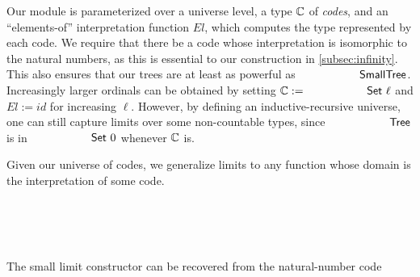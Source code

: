 Our module is parameterized over a universe level, a type ${\mathbb{C}}$ of \textit{codes}, and an ``elements-of'' interpretation
function $\mathit{El}$, which computes the type represented by each code.
We require that there be a code whose interpretation is isomorphic to the natural numbers,
as this is essential to our construction in \cref{subsec:infinity}.
This also ensures that our trees are at least as powerful as $\AgdaDatatype{SmallTree}$.
Increasingly larger ordinals can be obtained by setting $\bC := \AgdaPrimitive{Set} \ \ell$ and
$\mathit{El} := \mathit{id}$ for increasing $\ell$.
However, by defining an inductive-recursive universe,
one can still capture limits over some non-countable types, since
 $\AgdaDatatype{Tree}$ is in $\AgdaPrimitive{Set}\ 0$ whenever ${\mathbb{C}}$ is.

 Given our universe of codes,
 we generalize limits to any function whose domain is the interpretation of some code.
\begin{code}%
%
\>[4]\AgdaSpace{}%
\AgdaSpace{}%
\AgdaSymbol{:}\AgdaSpace{}%
\AgdaSpace{}%
\AgdaSpace{}%
\<%
\\
\>[4][@{}l@{\AgdaIndent{0}}]%
\>[6]\AgdaSpace{}%
\AgdaSymbol{:}\AgdaSpace{}%
\<%
\\
%
\>[6]\AgdaSpace{}%
\AgdaSymbol{:}\AgdaSpace{}%
\AgdaSpace{}%
\AgdaSpace{}%
\<%
\\
%
\>[6]\AgdaSpace{}%
\AgdaSymbol{:}\AgdaSpace{}%
\AgdaSymbol{(}\AgdaSpace{}%
\AgdaSymbol{:}\AgdaSpace{}%
\AgdaSpace{}%
\AgdaSymbol{)}\AgdaSpace{}%
\AgdaSpace{}%
\AgdaSymbol{(}\AgdaSpace{}%
\AgdaSymbol{:}\AgdaSpace{}%
\AgdaSpace{}%
\AgdaSpace{}%
\AgdaSpace{}%
\AgdaSymbol{)}\AgdaSpace{}%
\AgdaSpace{}%
\<%
\end{code}

The small limit constructor can be recovered from the natural-number code
\begin{code}%
%
\>[4]\AgdaSpace{}%
\AgdaSymbol{:}\AgdaSpace{}%
\AgdaSymbol{(}\AgdaSpace{}%
\AgdaSpace{}%
\AgdaSymbol{)}\AgdaSpace{}%
\AgdaSpace{}%
\<%
\\
%
\>[4]\AgdaSpace{}%
\AgdaSpace{}%
\AgdaSymbol{=}\AgdaSpace{}%
\AgdaSpace{}%
%
\>[21]\AgdaSpace{}%
\AgdaSpace{}%
\AgdaSpace{}%
\AgdaSpace{}%
\AgdaSymbol{(}\AgdaSpace{}%
\AgdaSpace{}%
\AgdaSymbol{))}\<%
\end{code}

